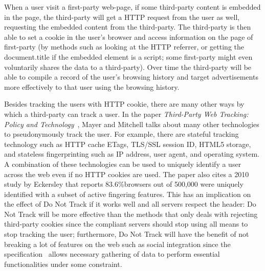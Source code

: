 \documentclass{sig-alternate}
\begin{document}
When a user visit a first-party web-page, if some third-party content is embedded in the page, the third-party will get a HTTP request from the user as well, requesting the embedded content from the third-party. The third-party is then able to set a cookie in the user’s browser and access information on the page of first-party (by methods such as looking at the HTTP referrer, or getting the document.title if the embedded element is a script; some first-party might even voluntarily shares the data to a third-party). Over time the third-party will be able to compile a record of the user's browsing history and target advertisements more effectively to that user using the browsing history.

Besides tracking the users with HTTP cookie, there are many other ways by which a third-party can track a user. In the paper \emph{Third-Party Web Tracking: Policy and Technology}~\cite{mayer2012third}, Mayer and Mitchell talks about many other technologies to pseudonymously track the user. For example, there are stateful tracking technology such as HTTP cache ETags, TLS/SSL session ID, HTML5 storage, and stateless fingerprinting such as IP address, user agent, and operating system. A combination of these technologies can be used to uniquely identify a user across the web even if no HTTP cookies are used. The paper also cites a 2010 study by Eckersley that reports 83.6\%browsers out of 500,000 were uniquely identified with a subset of active fingering features. This has an implication on the effect of Do Not Track if it works well and all servers respect the header: Do Not Track will be more effective than the methods that only deals with rejecting third-party cookies since the compliant servers should stop using all means to stop tracking the user; furthermore, Do Not Track will have the benefit of not breaking a lot of features on the web such as social integration since the specification~\cite{tracking_compliance_20130430} allows necessary gathering of data to perform essential functionalities under some constraint. 
\end{document}
